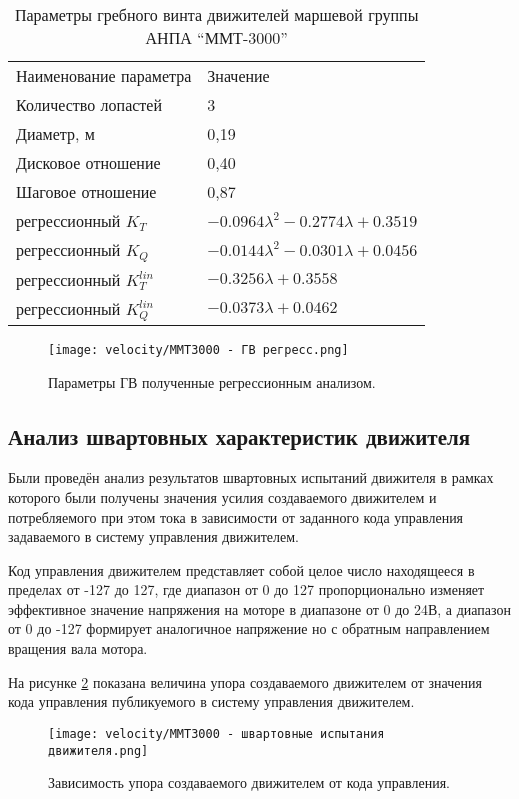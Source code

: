 \begin{table}
    \caption{Параметры гребного винта движителей маршевой группы АНПА ``ММТ-3000''
    }
    \label{tab:mmt3000_propeller}
    \centering
    \begin{tabular}{ll}
        Наименование параметра  & Значение\\
        Количество лопастей & 3 \\
        Диаметр, м & 0,19 \\
        Дисковое отношение & 0,40 \\
        Шаговое отношение & 0,87 \\
        регрессионный $K_T$ & $-0.0964\lambda^2 -0.2774\lambda + 0.3519$ \\
        регрессионный $K_Q$ & $-0.0144\lambda^2 -0.0301\lambda + 0.0456$ \\
        регрессионный $K_T^{lin}$ & $-0.3256\lambda + 0.3558$ \\
        регрессионный $K_Q^{lin}$ & $-0.0373\lambda + 0.0462$ \\
    \end{tabular}
\end{table}

\begin{figure}[ht]
    \centering
    \texttt{[image: velocity/MMT3000 - ГВ регресс.png]}
    \caption{Параметры ГВ полученные регрессионным анализом.}
    \label{fig:mmt3000_propeller}
\end{figure}

\subsection{Анализ швартовных характеристик движителя}
Были проведён анализ результатов швартовных испытаний движителя в рамках которого были получены значения усилия создаваемого движителем и потребляемого при этом тока в зависимости от заданного кода управления задаваемого в систему управления движителем.

Код управления движителем представляет собой целое число находящееся в пределах от -127 до 127, где диапазон от 0 до 127 пропорционально изменяет эффективное значение напряжения на моторе в диапазоне от 0 до 24В, а диапазон от 0 до -127 формирует аналогичное напряжение но с обратным направлением вращения вала мотора.

На рисунке \ref{fig:mmt3000_bollardpul} показана величина упора создаваемого движителем от значения кода управления публикуемого в систему управления движителем.
\begin{figure}[ht]
    \centering
    \texttt{[image: velocity/MMT3000 - швартовные испытания движителя.png]}
    \caption{Зависимость упора создаваемого движителем от кода управления.}
    \label{fig:mmt3000_bollardpul}
\end{figure}

